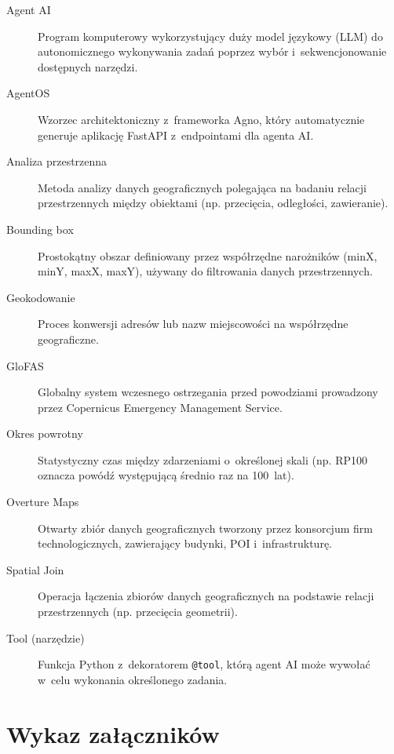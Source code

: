 \begin{description}
    \item[Agent AI] Program komputerowy wykorzystujący duży model językowy (LLM) do autonomicznego wykonywania zadań poprzez wybór i~sekwencjonowanie dostępnych narzędzi.

    \item[AgentOS] Wzorzec architektoniczny z~frameworka Agno, który automatycznie generuje aplikację FastAPI z~endpointami dla agenta AI.

    \item[Analiza przestrzenna] Metoda analizy danych geograficznych polegająca na badaniu relacji przestrzennych między obiektami (np. przecięcia, odległości, zawieranie).

    \item[Bounding box] Prostokątny obszar definiowany przez współrzędne narożników (minX, minY, maxX, maxY), używany do filtrowania danych przestrzennych.

    \item[Geokodowanie] Proces konwersji adresów lub nazw miejscowości na współrzędne geograficzne.

    \item[GloFAS] Globalny system wczesnego ostrzegania przed powodziami prowadzony przez Copernicus Emergency Management Service.

    \item[Okres powrotny] Statystyczny czas między zdarzeniami o~określonej skali (np. RP100 oznacza powódź występującą średnio raz na 100~lat).

    \item[Overture Maps] Otwarty zbiór danych geograficznych tworzony przez konsorcjum firm technologicznych, zawierający budynki, POI i~infrastrukturę.

    \item[Spatial Join] Operacja łączenia zbiorów danych geograficznych na podstawie relacji przestrzennych (np. przecięcia geometrii).

    \item[Tool (narzędzie)] Funkcja Python z~dekoratorem \texttt{@tool}, którą agent AI może wywołać w~celu wykonania określonego zadania.
\end{description}

\newpage
\section*{Wykaz załączników}

